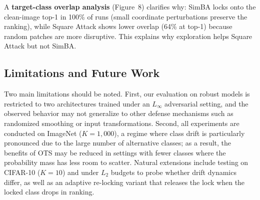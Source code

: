 \documentclass{cap2026}
\begin{document}
A \textbf{target-class overlap analysis} (Figure~8) clarifies why: SimBA locks onto the clean-image top-1 in 100\% of runs (small coordinate perturbations preserve the ranking), while Square Attack shows lower overlap (64\% at top-1) because random patches are more disruptive. This explains why exploration helps Square Attack but not SimBA.

\subsection*{Limitations and Future Work}\label{sec:limitations}
Two main limitations should be noted. First, our evaluation on robust models is restricted to two architectures trained under an $L_\infty$ adversarial setting, and the observed behavior may not generalize to other defense mechanisms such as randomized smoothing or input transformations. Second, all experiments are conducted on ImageNet ($K = 1{,}000$), a regime where class drift is particularly pronounced due to the large number of alternative classes; as a result, the benefits of OTS may be reduced in settings with fewer classes where the probability mass has less room to scatter. Natural extensions include testing on CIFAR-10 ($K=10$) and under $L_2$ budgets to probe whether drift dynamics differ, as well as an adaptive re-locking variant that releases the lock when the locked class drops in ranking.

\end{document}
